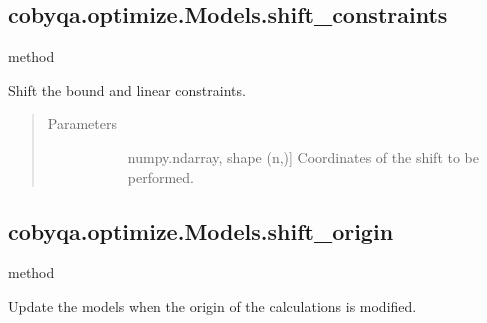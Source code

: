 \documentclass[letterpaper,10pt,english]{sphinxmanual}
\begin{document}
\begin{fulllineitems}
\begin{fulllineitems}
\end{fulllineitems}



\subsection{cobyqa.optimize.Models.shift\_constraints}
\label{\detokenize{refs/generated/cobyqa.optimize.Models.shift_constraints:cobyqa-optimize-models-shift-constraints}}\label{\detokenize{refs/generated/cobyqa.optimize.Models.shift_constraints::doc}}
\sphinxAtStartPar
method

\begin{fulllineitems}
\label{\detokenize{refs/generated/cobyqa.optimize.Models.shift_constraints:cobyqa.optimize.Models.shift_constraints}}
\sphinxAtStartPar
Shift the bound and linear constraints.
\begin{quote}\begin{description}
\item[{Parameters}] \leavevmode\begin{description}
\item[{}] \leavevmode{[}numpy.ndarray, shape (n,){]}
\sphinxAtStartPar
Coordinates of the shift to be performed.

\end{description}

\end{description}\end{quote}

\end{fulllineitems}



\subsection{cobyqa.optimize.Models.shift\_origin}
\label{\detokenize{refs/generated/cobyqa.optimize.Models.shift_origin:cobyqa-optimize-models-shift-origin}}\label{\detokenize{refs/generated/cobyqa.optimize.Models.shift_origin::doc}}
\sphinxAtStartPar
method

\begin{fulllineitems}
\label{\detokenize{refs/generated/cobyqa.optimize.Models.shift_origin:cobyqa.optimize.Models.shift_origin}}
\sphinxAtStartPar
Update the models when the origin of the calculations is modified.

\end{fulllineitems}
\end{fulllineitems}
\end{document}
